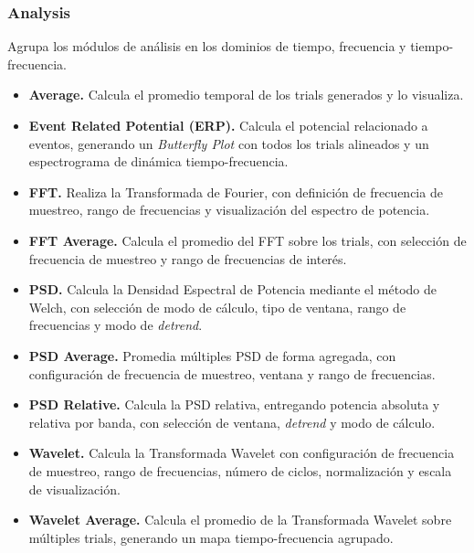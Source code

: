 \documentclass[12pt, letterpaper]{article}
\begin{document}
\subsubsection{Analysis}

Agrupa los módulos de análisis en los dominios de tiempo, frecuencia y
tiempo-frecuencia.

\begin{itemize}

    \item \textbf{Average.} Calcula el promedio temporal de los trials
    generados y lo visualiza.

    \item \textbf{Event Related Potential (ERP).} Calcula el potencial
    relacionado a eventos, generando un \textit{Butterfly Plot} con todos
    los trials alineados y un espectrograma de dinámica tiempo-frecuencia.

    \item \textbf{FFT.} Realiza la Transformada de Fourier, con definición
    de frecuencia de muestreo, rango de frecuencias y visualización del
    espectro de potencia.

    \item \textbf{FFT Average.} Calcula el promedio del FFT sobre los
    trials, con selección de frecuencia de muestreo y rango de frecuencias
    de interés.

    \item \textbf{PSD.} Calcula la Densidad Espectral de Potencia mediante
    el método de Welch, con selección de modo de cálculo, tipo de ventana,
    rango de frecuencias y modo de \textit{detrend}.

    \item \textbf{PSD Average.} Promedia múltiples PSD de forma agregada,
    con configuración de frecuencia de muestreo, ventana y rango de
    frecuencias.

    \item \textbf{PSD Relative.} Calcula la PSD relativa, entregando
    potencia absoluta y relativa por banda, con selección de ventana,
    \textit{detrend} y modo de cálculo.

    \item \textbf{Wavelet.} Calcula la Transformada Wavelet con configuración
    de frecuencia de muestreo, rango de frecuencias, número de ciclos,
    normalización y escala de visualización.

    \item \textbf{Wavelet Average.} Calcula el promedio de la Transformada
    Wavelet sobre múltiples trials, generando un mapa tiempo-frecuencia
    agrupado.


\end{itemize}
\end{document}
